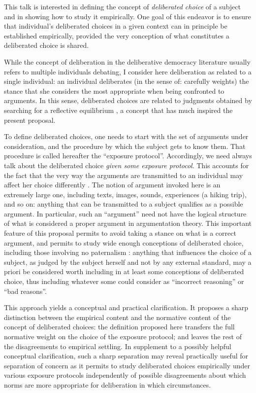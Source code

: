 \documentclass[version=last, pagesize, twoside=off, bibliography=totoc, DIV=calc, fontsize=12pt, a4paper, french, english]{scrartcl}
\begin{document}
This talk is interested in defining the concept of \emph{deliberated choice} of a subject and in showing how to study it empirically.
One goal of this endeavor is to ensure that individual’s deliberated choices in a given context can in principle be established empirically, provided the very conception of what constitutes a deliberated choice is shared.

While the concept of deliberation in the deliberative democracy literature usually refers to multiple individuals debating, I consider here deliberation as related to a single individual: an individual deliberates (in the sense of: carefully weights) the stance that she considers the most appropriate when being confronted to arguments. In this sense, deliberated choices are related to judgments obtained by searching for a reflective equilibrium \citep{rawls_theory_1999, goodman_fact_1983}, a concept that has much inspired the present proposal.

To define deliberated choices, one needs to start with the set of arguments under consideration, and the procedure by which the subject gets to know them. That procedure is called hereafter the “exposure protocol”.
Accordingly, we need always talk about the deliberated choice \emph{given some exposure protocol}. 
This accounts for the fact that the very way the arguments are transmitted to an individual may affect her choice differently \citep{railton_facts_2003}. 
The notion of argument invoked here is an extremely large one, including texts, images, sounds, experiences (a hiking trip), and so on: anything that can be transmitted to a subject qualifies as a possible argument. In particular, such an “argument” need not have the logical structure of what is considered a proper argument in argumentation theory. This important feature of this proposal permits to avoid taking a stance on what is a correct argument, and permits to study wide enough conceptions of deliberated choice, including those involving no paternalism \citep{cailloux_formal_2020}: anything that influences the choice of a subject, as judged by the subject herself and not by any external standard, may a priori be considered worth including in at least some conceptions of deliberated choice, thus including whatever some could consider as “incorrect reasoning” or “bad reasons”.

This approach yields a conceptual and practical clarification. It proposes a sharp distinction between the empirical content and the normative content of the concept of deliberated choices: the definition proposed here transfers the full normative weight on the choice of the exposure protocol; and leaves the rest of the disagreements to empirical settling. 
In supplement to a possibly helpful conceptual clarification, such a sharp separation may reveal practically useful for separation of concern as it permits to study deliberated choices empirically under various exposure protocols independently of possible disagreements about which norms are more appropriate for deliberation in which circumstances.
\end{document}
